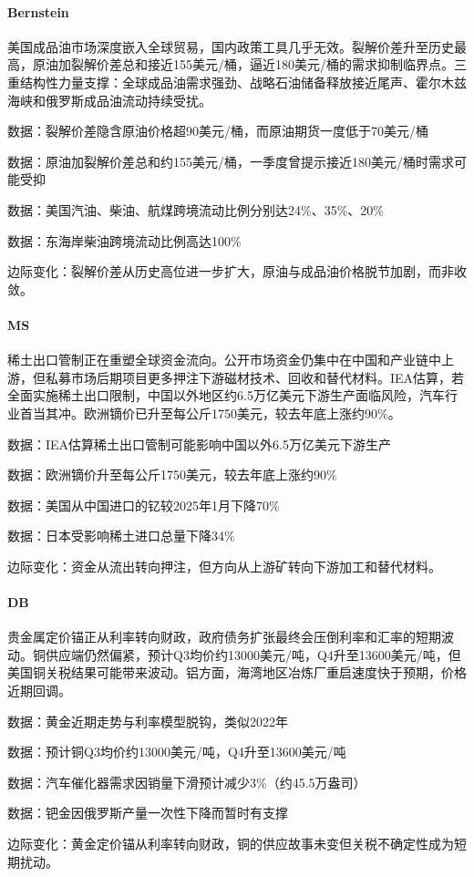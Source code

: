 \documentclass[11pt]{ctexart}
\begin{document}
\paragraph{Bernstein} 美国成品油市场深度嵌入全球贸易，国内政策工具几乎无效。裂解价差升至历史最高，原油加裂解价差总和接近155美元/桶，逼近180美元/桶的需求抑制临界点。三重结构性力量支撑：全球成品油需求强劲、战略石油储备释放接近尾声、霍尔木兹海峡和俄罗斯成品油流动持续受扰。
{\small\color{refgray}数据：裂解价差隐含原油价格超90美元/桶，而原油期货一度低于70美元/桶\par}
{\small\color{refgray}数据：原油加裂解价差总和约155美元/桶，一季度曾提示接近180美元/桶时需求可能受抑\par}
{\small\color{refgray}数据：美国汽油、柴油、航煤跨境流动比例分别达24\%、35\%、20\%\par}
{\small\color{refgray}数据：东海岸柴油跨境流动比例高达100\%\par}
{\small\color{refgray}边际变化：裂解价差从历史高位进一步扩大，原油与成品油价格脱节加剧，而非收敛。\par}
\paragraph{MS} 稀土出口管制正在重塑全球资金流向。公开市场资金仍集中在中国和产业链中上游，但私募市场后期项目更多押注下游磁材技术、回收和替代材料。IEA估算，若全面实施稀土出口限制，中国以外地区约6.5万亿美元下游生产面临风险，汽车行业首当其冲。欧洲镝价已升至每公斤1750美元，较去年底上涨约90\%。
{\small\color{refgray}数据：IEA估算稀土出口管制可能影响中国以外6.5万亿美元下游生产\par}
{\small\color{refgray}数据：欧洲镝价升至每公斤1750美元，较去年底上涨约90\%\par}
{\small\color{refgray}数据：美国从中国进口的钇较2025年1月下降70\%\par}
{\small\color{refgray}数据：日本受影响稀土进口总量下降34\%\par}
{\small\color{refgray}边际变化：资金从流出转向押注，但方向从上游矿转向下游加工和替代材料。\par}
\paragraph{DB} 贵金属定价锚正从利率转向财政，政府债务扩张最终会压倒利率和汇率的短期波动。铜供应端仍然偏紧，预计Q3均价约13000美元/吨，Q4升至13600美元/吨，但美国铜关税结果可能带来波动。铝方面，海湾地区冶炼厂重启速度快于预期，价格近期回调。
{\small\color{refgray}数据：黄金近期走势与利率模型脱钩，类似2022年\par}
{\small\color{refgray}数据：预计铜Q3均价约13000美元/吨，Q4升至13600美元/吨\par}
{\small\color{refgray}数据：汽车催化器需求因销量下滑预计减少3\%（约45.5万盎司）\par}
{\small\color{refgray}数据：钯金因俄罗斯产量一次性下降而暂时有支撑\par}
{\small\color{refgray}边际变化：黄金定价锚从利率转向财政，铜的供应故事未变但关税不确定性成为短期扰动。\par}
\end{document}
